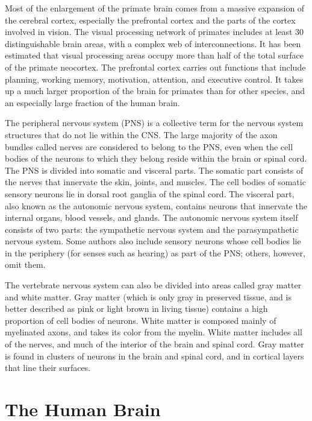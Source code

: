 Most of the enlargement of the primate brain comes from a massive expansion of the cerebral cortex, especially the prefrontal cortex and the parts of the cortex involved in vision. The visual processing network of primates includes at least 30 distinguishable brain areas, with a complex web of interconnections. It has been estimated that visual processing areas occupy more than half of the total surface of the primate neocortex. The prefrontal cortex carries out functions that include planning, working memory, motivation, attention, and executive control. It takes up a much larger proportion of the brain for primates than for other species, and an especially large fraction of the human brain.

The peripheral nervous system (PNS) is a collective term for the nervous system structures that do not lie within the CNS. The large majority of the axon bundles called nerves are considered to belong to the PNS, even when the cell bodies of the neurons to which they belong reside within the brain or spinal cord. The PNS is divided into somatic and visceral parts. The somatic part consists of the nerves that innervate the skin, joints, and muscles. The cell bodies of somatic sensory neurons lie in dorsal root ganglia of the spinal cord. The visceral part, also known as the autonomic nervous system, contains neurons that innervate the internal organs, blood vessels, and glands. The autonomic nervous system itself consists of two parts: the sympathetic nervous system and the parasympathetic nervous system. Some authors also include sensory neurons whose cell bodies lie in the periphery (for senses such as hearing) as part of the PNS; others, however, omit them.

The vertebrate nervous system can also be divided into areas called gray matter and white matter. Gray matter (which is only gray in preserved tissue, and is better described as pink or light brown in living tissue) contains a high proportion of cell bodies of neurons. White matter is composed mainly of myelinated axons, and takes its color from the myelin. White matter includes all of the nerves, and much of the interior of the brain and spinal cord. Gray matter is found in clusters of neurons in the brain and spinal cord, and in cortical layers that line their surfaces.

\hypertarget{the-human-brain}{%
\section{The Human Brain}\label{the-human-brain}}

